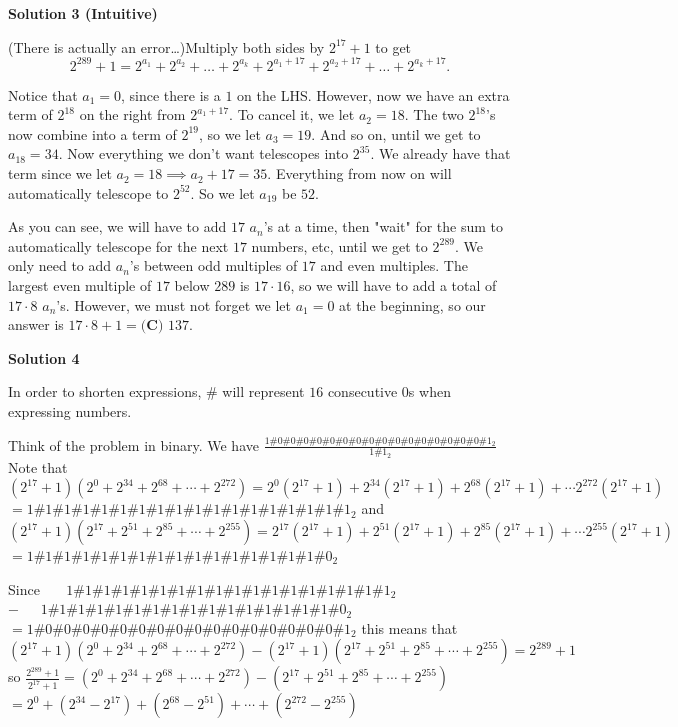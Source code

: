 \begin{enumerate}
 



\textbf{Solution 3 (Intuitive)}

(There is actually an error\ldots)Multiply both sides by $2^{17}+1$ to get 
 \[2^{289}+1=2^{a_1} + 2^{a_2} + \ldots + 2^{a_k} + 2^{a_1+17} + 2^{a_2+17} + \ldots + 2^{a_k+17}.\]

 Notice that $a_1 = 0$, since there is a $1$ on the LHS. However, now we have an extra term of $2^{18}$ on the right from $2^{a_1+17}$. To cancel it, we let $a_2 = 18$. The two $2^{18}$'s now combine into a term of $2^{19}$, so we let $a_3 = 19$. And so on, until we get to $a_{18} = 34$. Now everything we don't want telescopes into $2^{35}$. We already have that term since we let $a_2 = 18 \implies a_2+17 = 35$. Everything from now on will automatically telescope to $2^{52}$. So we let $a_{19}$ be $52$.

 As you can see, we will have to add $17$ $a_n$'s at a time, then "wait" for the sum to automatically telescope for the next $17$ numbers, etc, until we get to $2^{289}$. We only need to add $a_n$'s between odd multiples of $17$ and even multiples. The largest even multiple of $17$ below $289$ is $17\cdot16$, so we will have to add a total of $17\cdot 8$ $a_n$'s. However, we must not forget we let $a_1=0$ at the beginning, so our answer is $17\cdot8+1 = \boxed{\textbf{(C) } 137}$.

 



\textbf{Solution 4}

In order to shorten expressions, $\#$ will represent $16$ consecutive $0$s when expressing numbers. 

Think of the problem in binary. We have 
$\frac{1\#0\#0\#0\#0\#0\#0\#0\#0\#0\#0\#0\#0\#0\#0\#0\#0\#1_2}{1\#1_2}$ 
Note that 
$(2^{17} + 1) (2^0 + 2^{34} + 2^{68} + \cdots + 2^{272}) = 2^0(2^{17} + 1) + 2^{34}(2^{17} + 1) + 2^{68}(2^{17} + 1) + \cdots 2^{272}(2^{17} + 1)$
$= 1\#1\#1\#1\#1\#1\#1\#1\#1\#1\#1\#1\#1\#1\#1\#1\#1\#1_2$ 
and 
$(2^{17} + 1) (2^{17} + 2^{51} + 2^{85} + \cdots + 2^{255}) = 2^{17}(2^{17} + 1) + 2^{51}(2^{17} + 1) + 2^{85}(2^{17} + 1) + \cdots 2^{255}(2^{17} + 1)$
$= 1\#1\#1\#1\#1\#1\#1\#1\#1\#1\#1\#1\#1\#1\#1\#1\#0_2$ 

Since 
$\phantom{=\ } 1\#1\#1\#1\#1\#1\#1\#1\#1\#1\#1\#1\#1\#1\#1\#1\#1\#1_2$
$-\ \phantom{1\#} 1\#1\#1\#1\#1\#1\#1\#1\#1\#1\#1\#1\#1\#1\#1\#1\#0_2$
$= 1\#0\#0\#0\#0\#0\#0\#0\#0\#0\#0\#0\#0\#0\#0\#0\#0\#1_2$ 
this means that
$(2^{17} + 1) (2^0 + 2^{34} + 2^{68} + \cdots + 2^{272}) - (2^{17} + 1) (2^{17} + 2^{51} + 2^{85} + \cdots + 2^{255}) = 2^{289} + 1$
so 
$\frac{2^{289}+1}{2^{17}+1} = (2^0 + 2^{34} + 2^{68} + \cdots + 2^{272}) - (2^{17} + 2^{51} + 2^{85} + \cdots + 2^{255})$
$= 2^0 + (2^{34} - 2^{17}) + (2^{68} - 2^{51}) + \cdots + (2^{272} - 2^{255})$ 


\end{enumerate}
